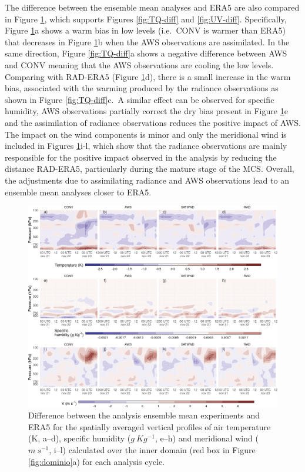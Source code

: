 \documentclass[final,5p,times,twocolumn,authoryear]{elsarticle} %
\begin{document}
The difference between the ensemble mean analyses and ERA5 \citep[`]{era5pressure} are also compared in Figure \ref{fig:era5}, which supports Figures \ref{fig:TQ-diff} and \ref{fig:UV-diff}. Specifically, Figure \ref{fig:era5}a shows a warm bias in low levels (i.e.~CONV is warmer than ERA5) that decreases in Figure \ref{fig:era5}b when the AWS observations are assimilated. In the same direction, Figure \ref{fig:TQ-diff}a shows a negative difference between AWS and CONV meaning that the AWS observations are cooling the low levels. Comparing with RAD-ERA5 (Figure \ref{fig:era5}d), there is a small increase in the warm bias, associated with the warming produced by the radiance observations as shown in Figure \ref{fig:TQ-diff}c.~A similar effect can be observed for specific humidity, AWS observations partially correct the dry bias present in Figure \ref{fig:era5}e and the assimilation of radiance observations reduces the positive impact of AWS. The impact on the wind components is minor and only the meridional wind is included in Figures \ref{fig:era5}i-l, which show that the radiance observations are mainly responsible for the positive impact observed in the analysis by reducing the distance RAD-ERA5, particularly during the mature stage of the MCS. Overall, the adjustments due to assimilating radiance and AWS observations lead to an ensemble mean analyses closer to ERA5.



\begin{figure}[ht]

{\centering \includegraphics{../figures/era5-1} 

}

\caption{Difference between the analysis ensemble mean experiments and ERA5 for the spatially averaged vertical profiles of air temperature (K, a--d), specific humidity (\(g\ Kg^{-1}\), e--h) and meridional wind (\(m\ s^{-1}\), i--l) calculated over the inner domain (red box in Figure \ref{fig:dominio}a) for each analysis cycle.}\label{fig:era5}
\end{figure}
\end{document}
